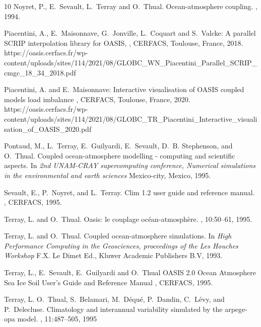 \begin{thebibliography}{10}
Noyret, P., E.~Sevault, L.~Terray and O.~Thual.
\newblock Ocean-atmosphere coupling.
,
1994.

Piacentini, A., E.~Maisonnave, G.~Jonville, L.~Coquart and S.~Valcke:
\newblock A parallel SCRIP interpolation library for OASIS,
,
\newblock CERFACS, Toulouse, France, 2018.
\newblock https://oasis.cerfacs.fr/wp-content/uploads/sites/114/2021/08/GLOBC\_WN\_Piacentini\_Parallel\_SCRIP\_cmgc\_18\_34\_2018.pdf

Piacentini, A. and E.~Maisonnave: 
\newblock Interactive visualisation of OASIS coupled models load imbalance
,
\newblock CERFACS, Toulouse, France, 2020.
\newblock https://oasis.cerfacs.fr/wp-content/uploads/sites/114/2021/08/GLOBC\_TR\_Piacentini\_Interactive\_visualisation\_of\_OASIS\_2020.pdf

Pontaud, M., L.~Terray, E.~Guilyardi, E.~Sevault, D.~B. Stephenson, and
  O.~Thual.
\newblock Coupled ocean-atmosphere modelling - computing and scientific
  aspects.
\newblock In {\em 2nd UNAM-CRAY supercomputing conference, Numerical
  simulations in the environmental and earth sciences}
\newblock Mexico-city, Mexico, 1995.

Sevault, E., P.~Noyret, and L.~Terray.
\newblock Clim 1.2 user guide and reference manual.
, CERFACS, 1995.

Terray, L. and O.~Thual.
\newblock Oasis: le couplage oc\'ean-atmosph\`ere.
, 10:50--61, 1995.

Terray, L. and O.~Thual.
\newblock Coupled ocean-atmosphere simulations.
\newblock In {\em High Performance Computing in the Geosciences,
proceedings of the Les Houches Workshop}
\newblock F.X. Le Dimet Ed., Kluwer Academic Publishers B.V, 1993.

Terray, L., E.~Sevault, E.~Guilyardi and O.~Thual
\newblock OASIS 2.0 Ocean Atmosphere Sea Ice Soil User's Guide and Reference Manual
, CERFACS, 1995.

Terray, L. O.~Thual, S.~Belamari, M.~D\'equ\'e, P.~Dandin, C.~L\'evy, and
P.~Delecluse.
\newblock Climatology and interannual variability simulated by the arpege-opa
model.
, 11:487--505, 1995


\end{thebibliography}
